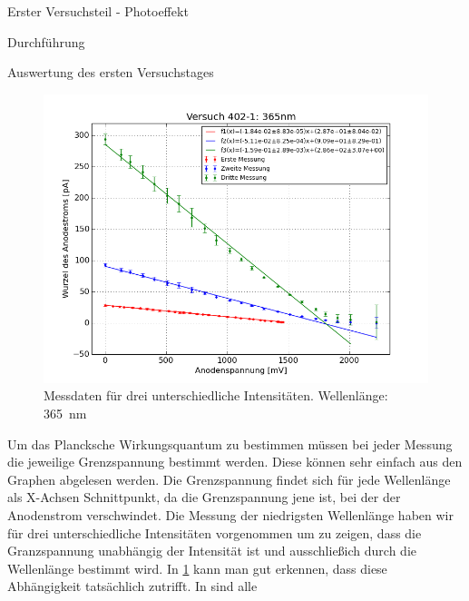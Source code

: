 \documentclass[pdftex, a4paper,11pt, twoside, ngerman]{report}
\begin{document}
\begin{chapter}{Erster Versuchsteil - Photoeffekt}
\begin{section}{Durchführung}
    \end{section}
   
   
   
    \begin{section}{Auswertung des ersten Versuchstages}
      \label{chp:Photoeffekt:sec:Auswertung}
      \begin{figure}[b!]
        \begin{center}
          \includegraphics[width=\textwidth]{Figures/Versuch402_1_365.png}
          \caption{Messdaten für drei unterschiedliche Intensitäten.
              Wellenlänge: \SI{365}{\nano\meter}}
          \label{fig:Versuch402_1_365}
        \end{center}
      \end{figure}
      Um das Plancksche Wirkungsquantum zu bestimmen müssen bei jeder Messung
      die jeweilige Grenzspannung bestimmt werden. Diese können sehr einfach
      aus den Graphen abgelesen werden. Die Grenzspannung findet sich für jede
      Wellenlänge als X-Achsen Schnittpunkt, da die Grenzspannung jene ist,
      bei der der Anodenstrom verschwindet. Die Messung der niedrigsten
      Wellenlänge haben wir für drei unterschiedliche Intensitäten vorgenommen
      um zu zeigen, dass die Granzspannung unabhängig der Intensität ist und
      ausschließich durch die Wellenlänge bestimmt wird. In
      \cref{fig:Versuch402_1_365} kann man gut erkennen, dass diese
      Abhängigkeit tatsächlich zutrifft. In
       sind alle

\end{section}
\end{chapter}
\end{document}
